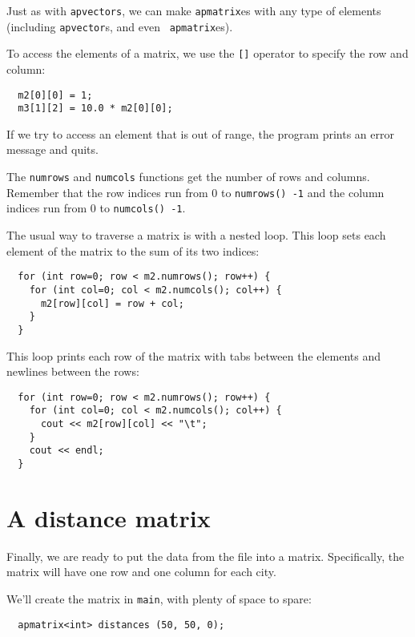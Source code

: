
Just as with {\tt apvectors}, we can make {\tt apmatrix}es with any
type of elements (including {\tt apvector}s, and even {\tt
apmatrix}es).

To access the elements of a matrix, we use the {\tt []} operator
to specify the row and column:

\begin{verbatim}
  m2[0][0] = 1;
  m3[1][2] = 10.0 * m2[0][0];
\end{verbatim}
%
If we try to access an element that is out of range, the program
prints an error message and quits.


The {\tt numrows} and {\tt numcols} functions get the number of
rows and columns.  Remember that the row indices run from 0 to
{\tt numrows() -1} and the column indices run from 0 to
{\tt numcols() -1}.


The usual way to traverse a matrix is with a nested loop.
This loop sets each element of the matrix to the sum of its
two indices:

\begin{verbatim}
  for (int row=0; row < m2.numrows(); row++) {
    for (int col=0; col < m2.numcols(); col++) {
      m2[row][col] = row + col;
    }
  }
\end{verbatim}
%
This loop prints each row of the matrix with tabs between the
elements and newlines between the rows:

\begin{verbatim}
  for (int row=0; row < m2.numrows(); row++) {
    for (int col=0; col < m2.numcols(); col++) {
      cout << m2[row][col] << "\t";
    }
    cout << endl;
  }
\end{verbatim}
%

\section{A distance matrix}

Finally, we are ready to put the data from the file into
a matrix.  Specifically, the matrix will have one row and
one column for each city.

We'll create the matrix in {\tt main}, with plenty of space
to spare:

\begin{verbatim}
  apmatrix<int> distances (50, 50, 0);
\end{verbatim}
%

